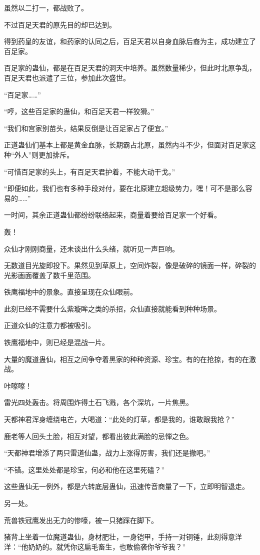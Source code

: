 \begin{this_body}
虽然以二打一，都战败了。

不过百足天君的原先目的却已达到。

得到药皇的友谊，和药家的认同之后，百足天君以自身血脉后裔为主，成功建立了百足家。

百足家的蛊仙，都是在百足天君的洞天中培养。虽然数量稀少，但此时北原争乱，百足天君也派遣了三位，参加此次盛世。

“百足家……”

“哼，这些百足家的蛊仙，和百足天君一样狡猾。”

“我们和宫家别苗头，结果反倒是让百足家占了便宜。”

正道蛊仙们基本上都是黄金血脉，长期霸占北原，虽然内斗不少，但面对百足家这种“外人”则更加排斥。

“可惜百足家的头上，有百足天君护着，不能大动干戈。”

“即便如此，我们也有多种手段对付，要在北原建立超级势力，嘿！可不是那么容易的……”

一时间，其余正道蛊仙都纷纷联络起来，商量着要给百足家一个好看。

轰！

众仙才刚刚商量，还未谈出什么头绪，就听见一声巨响。

无数道目光旋即投下。果然见到草原上，空间炸裂，像是破碎的镜面一样，碎裂的光影画面覆盖了数千里范围。

铁鹰福地中的景象。直接呈现在众仙眼前。

此刻已经不需要什么紫璇眸之类的杀招，众仙直接就能看到种种场景。

正道众仙的注意力都被吸引。

铁鹰福地中，则已经是混战一片。

大量的魔道蛊仙，相互之间争夺着黑家的种种资源、珍宝。有的在抢掠，有的在激战。

咔嚓嚓！

雷光四处轰击。将周围炸得土石飞溅，各个深坑，一片焦黑。

天都神君浑身缠绕电芒，大喝道：“此处的灯草，都是我的，谁敢跟我抢？”

鹿老等人回头土脸，相互对望，都看出彼此满脸的忌惮之色。

“天都神君增添了两只雷道仙蛊，战力上涨得厉害，我们还是撤吧。”

“不错。这里处处都是珍宝，何必和他在这里死磕？”

这些蛊仙无一例外，都是六转底层蛊仙，迅速传音商量了一下，立即明智退走。

另一处。

荒兽铁冠鹰发出无力的惨嚎，被一只猪踩在脚下。

猪背上坐着一位魔道蛊仙，身材肥壮，一身铠甲，手持一对铜锤，此刻得意洋洋：“他奶奶的。就凭你这扁毛畜生，也敢偷袭你爷爷我？”


\end{this_body}
